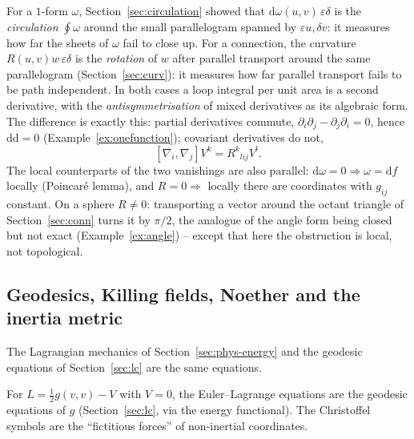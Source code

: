 \documentclass[11pt,a4paper]{article}
\numberwithin{equation}{section}
\theoremstyle{definition}
\theoremstyle{plain}
\newcommand{\dd}{\mathrm{d}}
\begin{document}
\begin{synthesis}
For a $1$-form $\omega$, Section~\ref{sec:circulation} showed that $\dd\omega(u,v)\,\varepsilon\delta$ is the \emph{circulation} $\oint\omega$ around the small parallelogram spanned by $\varepsilon u,\delta v$: it measures how far the sheets of $\omega$ fail to close up.
For a connection, the curvature $R(u,v)w\,\varepsilon\delta$ is the \emph{rotation} of $w$ after parallel transport around the same parallelogram (Section~\ref{sec:curv}): it measures how far parallel transport fails to be path independent.
In both cases a loop integral per unit area is a second derivative, with the \emph{antisymmetrisation} of mixed derivatives as its algebraic form. The difference is exactly this: partial derivatives commute, $\partial_i\partial_j-\partial_j\partial_i=0$, hence $\dd\dd=0$ (Example~\ref{ex:onefunction}); covariant derivatives do not,
\[
[\nabla_i,\nabla_j]V^k=R^k{}_{lij}V^l .
\]
The local counterparts of the two vanishings are also parallel: $\dd\omega=0\Rightarrow\omega=\dd f$ locally (Poincar\'e lemma), and $R=0\Rightarrow$ locally there are coordinates with $g_{ij}$ constant.
On a sphere $R\neq0$: transporting a vector around the octant triangle of Section~\ref{sec:conn} turns it by $\pi/2$, the analogue of the angle form being closed but not exact (Example~\ref{ex:angle}) -- except that here the obstruction is local, not topological.
\end{synthesis}

\subsection{Geodesics, Killing fields, Noether and the inertia metric}\label{sec:noethersynth}

The Lagrangian mechanics of Section~\ref{sec:phys-energy} and the geodesic equations of Section~\ref{sec:lc} are the same equations.

\begin{synthesis}[free motion $=$ geodesic of the inertia metric]
For $L=\frac12g(v,v)-V$ with $V=0$, the Euler--Lagrange equations are the geodesic equations of $g$ (Section~\ref{sec:lc}, via the energy functional). The Christoffel symbols are the ``fictitious forces'' of non-inertial coordinates.
\end{synthesis}
\end{document}
